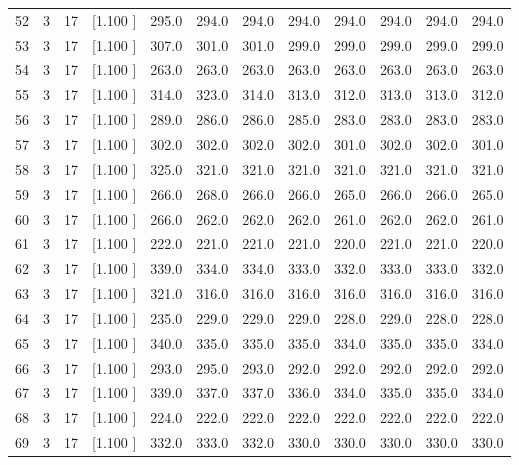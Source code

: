 \documentclass[12pt,a4paper]{article}
\begin{document}
\begin{center}
{\begin{tabular}{r r r r r r r r r r r r}
  52&  3& 17&[1.100     ]&   295.0&   294.0&   294.0&   294.0&   294.0&   294.0&   294.0&   294.0\\[-0.02in]
  53&  3& 17&[1.100     ]&   307.0&   301.0&   301.0&   299.0&   299.0&   299.0&   299.0&   299.0\\[-0.02in]
  54&  3& 17&[1.100     ]&   263.0&   263.0&   263.0&   263.0&   263.0&   263.0&   263.0&   263.0\\[-0.02in]
  55&  3& 17&[1.100     ]&   314.0&   323.0&   314.0&   313.0&   312.0&   313.0&   313.0&   312.0\\[-0.02in]
  56&  3& 17&[1.100     ]&   289.0&   286.0&   286.0&   285.0&   283.0&   283.0&   283.0&   283.0\\[-0.02in]
  57&  3& 17&[1.100     ]&   302.0&   302.0&   302.0&   302.0&   301.0&   302.0&   302.0&   301.0\\[-0.02in]
  58&  3& 17&[1.100     ]&   325.0&   321.0&   321.0&   321.0&   321.0&   321.0&   321.0&   321.0\\[-0.02in]
  59&  3& 17&[1.100     ]&   266.0&   268.0&   266.0&   266.0&   265.0&   266.0&   266.0&   265.0\\[-0.02in]
  60&  3& 17&[1.100     ]&   266.0&   262.0&   262.0&   262.0&   261.0&   262.0&   262.0&   261.0\\[-0.02in]
  61&  3& 17&[1.100     ]&   222.0&   221.0&   221.0&   221.0&   220.0&   221.0&   221.0&   220.0\\[-0.02in]
  62&  3& 17&[1.100     ]&   339.0&   334.0&   334.0&   333.0&   332.0&   333.0&   333.0&   332.0\\[-0.02in]
  63&  3& 17&[1.100     ]&   321.0&   316.0&   316.0&   316.0&   316.0&   316.0&   316.0&   316.0\\[-0.02in]
  64&  3& 17&[1.100     ]&   235.0&   229.0&   229.0&   229.0&   228.0&   229.0&   228.0&   228.0\\[-0.02in]
  65&  3& 17&[1.100     ]&   340.0&   335.0&   335.0&   335.0&   334.0&   335.0&   335.0&   334.0\\[-0.02in]
  66&  3& 17&[1.100     ]&   293.0&   295.0&   293.0&   292.0&   292.0&   292.0&   292.0&   292.0\\[-0.02in]
  67&  3& 17&[1.100     ]&   339.0&   337.0&   337.0&   336.0&   334.0&   335.0&   335.0&   334.0\\[-0.02in]
  68&  3& 17&[1.100     ]&   224.0&   222.0&   222.0&   222.0&   222.0&   222.0&   222.0&   222.0\\[-0.02in]
  69&  3& 17&[1.100     ]&   332.0&   333.0&   332.0&   330.0&   330.0&   330.0&   330.0&   330.0\\[-0.02in]

\end{tabular}}
\end{center}
\end{document}
